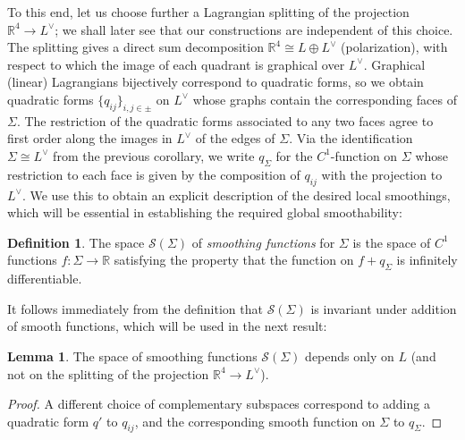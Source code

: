 \documentclass[11pt]{article}
\newcommand{\bR}{\mathbb{R}}
\newcommand{\co}{\colon}
\newcommand{\scrS}{\mathscr{S}}
\theoremstyle{definition}
\newtheorem{definition}{Definition}
\newtheorem{lemma}{Lemma}
\begin{document}
To this end, let us choose further a Lagrangian splitting of the projection $\bR^4 \to L^\vee$; we shall later see that our constructions are independent of this choice. The splitting gives a direct sum decomposition $\bR^4 \cong L \oplus L^\vee$  (polarization), with respect to which the image of each quadrant is graphical over $L^\vee$. Graphical (linear) Lagrangians bijectively correspond to quadratic forms, so we obtain quadratic forms $\{ q_{ij}\}_{i,j \in \pm}$ on $L^\vee$ whose graphs contain the corresponding faces of $\Sigma$. The restriction of the quadratic forms associated to any two faces agree to first order along the images in $L^\vee$ of the edges of $\Sigma$. Via the identification $\Sigma \cong L^\vee$ from the previous corollary, we write $q_{\Sigma}$ for the $C^1$-function on $\Sigma$ whose restriction to each face is given by the composition of $q_{ij}$ with the projection to $L^\vee$.   We use this to obtain an explicit description of the desired local smoothings, which will be essential in establishing the required global smoothability:
  \begin{definition} \label{def:smoothing_function}
The space $\scrS(\Sigma)$ of  \emph{smoothing functions} for $\Sigma$ is the space of $C^1$ functions $f \co \Sigma \to \bR$ satisfying the property that the function on $f + q_{\Sigma}$  is infinitely differentiable.
\end{definition}
It follows immediately from the definition that  $\scrS(\Sigma)$ is invariant under addition of smooth functions, which will be used in the next result:
\begin{lemma} \label{lem:independence_dual_Lagrangian}
    The space of smoothing functions  $\scrS(\Sigma)$ depends only on $L$ (and not on the splitting of the projection $\bR^4 \to L^\vee$).
  \end{lemma}
  \begin{proof}
A different choice of complementary subspaces correspond to adding a quadratic form $q'$ to $q_{ij}$, and the corresponding smooth function on $\Sigma$ to $q_{\Sigma}$.
\end{proof}
\end{document}
